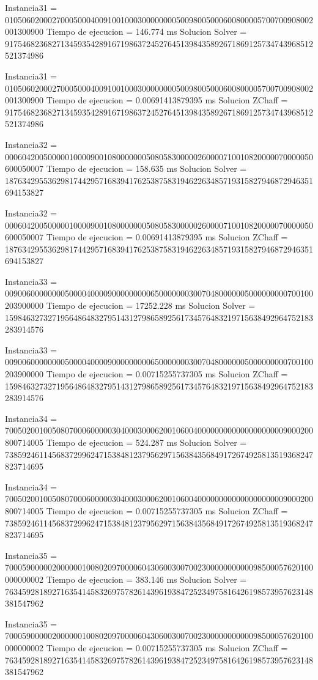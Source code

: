 Instancia31 = 010506020002700050004009100100030000000050098005000600800005700700908002001300900
Tiempo de ejecucion = 146.774 ms
Solucion Solver = 917546823682713459354289167198637245276451398435892671869125734743968512521374986

Instancia31 = 010506020002700050004009100100030000000050098005000600800005700700908002001300900
Tiempo de ejecucion = 0.00691413879395 ms
Solucion ZChaff = 917546823682713459354289167198637245276451398435892671869125734743968512521374986

Instancia32 = 000604200500000100009001080000000508058300000260000710010820000070000050600050007
Tiempo de ejecucion = 158.635 ms
Solucion Solver = 187634295536298174429571683941762538758319462263485719315827946872946351694153827

Instancia32 = 000604200500000100009001080000000508058300000260000710010820000070000050600050007
Tiempo de ejecucion = 0.00691413879395 ms
Solucion ZChaff = 187634295536298174429571683941762538758319462263485719315827946872946351694153827

Instancia33 = 009006000000005000040000900000000065000000030070480000005000000000700100203900000
Tiempo de ejecucion = 17252.228 ms
Solucion Solver = 159846327327195648648327951431279865892561734576483219715638492964752183283914576

Instancia33 = 009006000000005000040000900000000065000000030070480000005000000000700100203900000
Tiempo de ejecucion = 0.00715255737305 ms
Solucion ZChaff = 159846327327195648648327951431279865892561734576483219715638492964752183283914576

Instancia34 = 700502001005080700060000030400030006200106004000000000000000000009000200800714005
Tiempo de ejecucion = 524.287 ms
Solucion Solver = 738592461145683729962471538481237956297156384356849172674925813519368247823714695

Instancia34 = 700502001005080700060000030400030006200106004000000000000000000009000200800714005
Tiempo de ejecucion = 0.00715255737305 ms
Solucion ZChaff = 738592461145683729962471538481237956297156384356849172674925813519368247823714695

Instancia35 = 700059000002000000100802097000060430600300700230000000000098500057620100000000002
Tiempo de ejecucion = 383.146 ms
Solucion Solver = 763459281892716354145832697578261439619384725234975816426198573957623148381547962

Instancia35 = 700059000002000000100802097000060430600300700230000000000098500057620100000000002
Tiempo de ejecucion = 0.00715255737305 ms
Solucion ZChaff = 763459281892716354145832697578261439619384725234975816426198573957623148381547962

